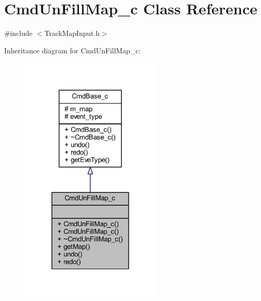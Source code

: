 \hypertarget{class_cmd_un_fill_map__c}{\section{Cmd\+Un\+Fill\+Map\+\_\+c Class Reference}
\label{class_cmd_un_fill_map__c}
}


{\ttfamily \#include $<$Track\+Map\+Input.\+h$>$}



Inheritance diagram for Cmd\+Un\+Fill\+Map\+\_\+c\+:
\nopagebreak
\begin{figure}[H]
\begin{center}
\leavevmode
\includegraphics[width=192pt]{class_cmd_un_fill_map__c__inherit__graph}
\end{center}
\end{figure}


